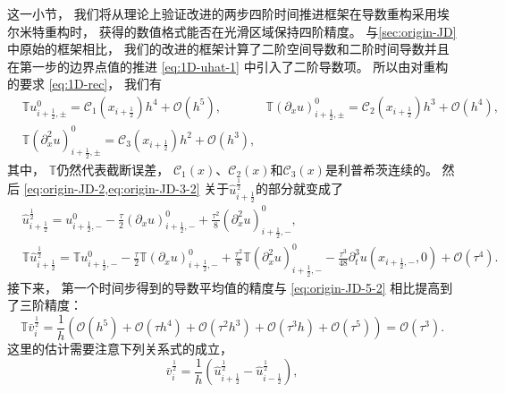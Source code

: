 这一小节，
我们将从理论上验证改进的两步四阶时间推进框架在导数重构采用埃尔米特重构时，
获得的数值格式能否在光滑区域保持四阶精度。
与\cref{sec:origin-JD}中原始的框架相比，
我们的改进的框架计算了二阶空间导数和二阶时间导数并且在第一步的边界点值的推进 \cref{eq:1D-uhat-1} 中引入了二阶导数项。
所以由对重构的要求 \cref{eq:1D-rec}，
我们有
\begin{equation}
  \begin{aligned}
     & {\mathbb{T}}u_{i+\frac12,\pm}^0 = \mathcal{C}_1(x_{i+\frac{1}{2}})h^4+{\mathcal{O}}(h^{5}), \quad
     & {\mathbb{T}}\left({\partial_x}u\right)_{i+\frac12,\pm}^0 = \mathcal{C}_2(x_{i+\frac{1}{2}})h^3+{\mathcal{O}}(h^{4}),    \\
     & {\mathbb{T}}\left({\partial_x^2}u\right)_{i+\frac12,\pm}^0 = \mathcal{C}_3(x_{i+\frac{1}{2}})h^2+{\mathcal{O}}(h^{3}),
  \end{aligned}
\end{equation}
其中，
${\mathbb{T}}$仍然代表截断误差，
$\mathcal{C}_1(x)$、$\mathcal{C}_2(x)$和$\mathcal{C}_3(x)$是利普希茨连续的。
然后 \cref{eq:origin-JD-2,eq:origin-JD-3-2} 关于$\hat u^{\frac{1}{2}}_{i+\frac{1}{2}}$的部分就变成了
\begin{align}
   & \hat{u}^{\frac12}_{i+\frac12} = u_{i+\frac{1}{2},-}^{0} - \frac\tau2\left({\partial_x}u\right)_{i+\frac{1}{2},-}^{0} + \frac{\tau^2}{8}\left({\partial_x^2}u\right)_{i+\frac{1}{2},-}^{0}, \\
   & {\mathbb{T}}\hat {u}^{\frac 12}_{i+\frac 12} =
    {\mathbb{T}} u_{i+\frac{1}{2},-}^{0}-\frac\tau2 {\mathbb{T}} \left({\partial_{x}} u\right)_{i+\frac 12,-}^{0}
  + \frac{\tau^2}{8} {\mathbb{T}} \left({\partial_{x}^2} u\right)_{i+\frac{1}{2},-}^{0} - \frac{\tau^3}{48}{\partial_{t}^3} u(x_{i+\frac 12,-}, 0)+{\mathcal{O}}(\tau^4).
\end{align}
接下来，
第一个时间步得到的导数平均值的精度与 \cref{eq:origin-JD-5-2} 相比提高到了三阶精度：
\begin{equation}
  {\mathbb{T}} \bar v_{i}^{\frac 12} = \frac{1}{h}\left({\mathcal{O}}(h^5) + {\mathcal{O}}(\tau h^4) + {\mathcal{O}}(\tau^2 h^3) + {\mathcal{O}}(\tau^3 h) + {\mathcal{O}}(\tau^5)\right) = {\mathcal{O}}(\tau^3).
\end{equation}
这里的估计需要注意下列关系式的成立，
\begin{equation}
  \bar v_{i}^{\frac 12} = \frac{1}{h} \left(\hat {u}^{\frac 12}_{i+\frac 12}-\hat {u}^{\frac 12}_{i-\frac 12}\right),
\end{equation}
